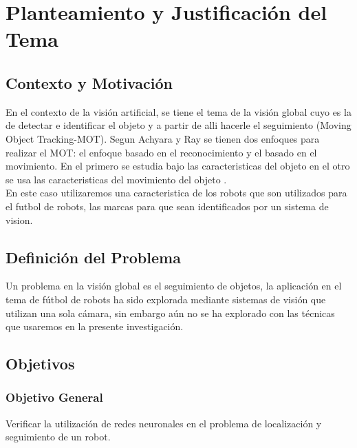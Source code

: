 
\chapter{Planteamiento y Justificaci\'on del Tema}
\section{Contexto y Motivaci\'on}
En el contexto de la visi\'on artificial, se tiene el tema de la visi\'on global cuyo  es la de detectar e identificar el objeto y  a partir de alli hacerle el seguimiento (Moving Object Tracking-MOT). Segun Achyara y Ray  se tienen dos enfoques para realizar el MOT: el enfoque basado en el reconocimiento y el basado en el movimiento. En el primero se estudia bajo las caracteristicas del objeto en el otro se usa las caracteristicas del movimiento del objeto \cite{acharya_g}.\\
En este caso utilizaremos una caracteristica de los robots que son utilizados para el futbol de robots, las marcas para que sean identificados por un sistema de vision.

\section{Definici\'on del Problema}
Un problema en la visi\'on global es el seguimiento de objetos, la aplicaci\'on en el tema de f\'utbol de robots ha sido explorada mediante sistemas de visi\'on que utilizan una sola c\'amara, sin embargo a\'un no se ha explorado con las t\'ecnicas que usaremos en la presente investigaci\'on.
\section{Objetivos}
\subsection{Objetivo General}
Verificar la utilizaci\'on de redes neuronales en el problema de localizaci\'on y seguimiento de un robot.
